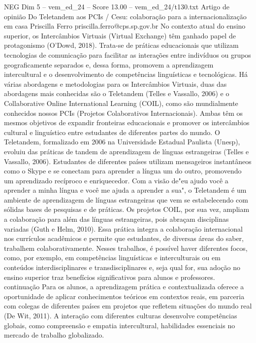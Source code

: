 \begin{textsample}{NEG Dim 5 – vem\_ed\_24 – Score 13.00 – vem\_ed\_24/t130.txt}  \label{ex:f5_neg_155}
Artigo de opinião Do Teletandem aos PCIs / Cesu: colaboração para a internacionalização em casa Priscilla Ferro priscilla.ferro@cps.sp.gov.br No contexto atual do ensino superior, os Intercâmbios Virtuais (Virtual Exchange) têm ganhado papel de protagonismo (O'Dowd, 2018).
Trata-se de práticas educacionais que utilizam tecnologias de comunicação para facilitar as interações entre indivíduos ou grupos geograficamente separados e, dessa forma, promovem a aprendizagem intercultural e o desenvolvimento de competências linguísticas e tecnológicas.
Há várias abordagens e metodologias para os Intercâmbios Virtuais, duas das abordagens mais conhecidas são o Teletandem (Telles e Vassallo, 2006) e o Collaborative Online International Learning (COIL), como são mundialmente conhecidos nossos PCIs (Projetos Colaborativos Internacionais).
Ambas têm os mesmos objetivos de expandir fronteiras educacionais e promover os intercâmbios cultural e linguístico entre estudantes de diferentes partes do mundo.
O Teletandem, formalizado em 2006 na Universidade Estadual Paulista (Unesp), evoluiu das práticas de tandem de aprendizagem de línguas estrangeiras (Telles e Vassallo, 2006).
Estudantes de diferentes países utilizam mensageiros instantâneos como o Skype e se conectam para aprender a língua um do outro, promovendo um aprendizado recíproco e enriquecedor.
Com a visão de"eu ajudo você a aprender a minha língua e você me ajuda a aprender a sua", o Teletandem é um ambiente de aprendizagem de línguas estrangeiras que vem se estabelecendo com sólidas bases de pesquisas e de práticas.
Os projetos COIL, por sua vez, ampliam a colaboração para além das línguas estrangeiras, pois abraçam disciplinas variadas (Guth e Helm, 2010).
Essa prática integra a colaboração internacional nos currículos acadêmicos e permite que estudantes, de diversas áreas do saber, trabalhem colaborativamente.
Nesses trabalhos, é possível haver diferentes focos, como, por exemplo, em competências linguísticas e interculturais ou em conteúdos interdisciplinares e transdisciplinares e, seja qual for, sua adoção no ensino superior traz benefícios significativos para alunos e professores. continuação Para os alunos, a aprendizagem prática e contextualizada oferece a oportunidade de aplicar conhecimentos teóricos em contextos reais, em parceria com colegas de diferentes países em projetos que refletem situações do mundo real (De Wit, 2011).
A interação com diferentes culturas desenvolve competências globais, como compreensão e empatia intercultural, habilidades essenciais no mercado de trabalho globalizado.

\end{textsample}
